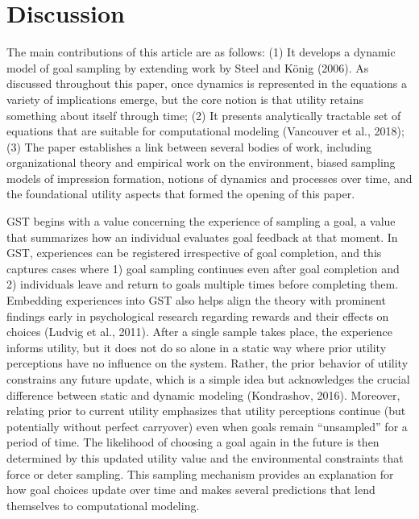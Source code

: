\documentclass[english,,man]{apa6}
\theoremstyle{definition}
\theoremstyle{definition}
\theoremstyle{definition}
\theoremstyle{remark}
\begin{document}
\hypertarget{discussion}{%
\section{Discussion}\label{discussion}}

The main contributions of this article are as follows: (1) It develops a
dynamic model of goal sampling by extending work by Steel and König
(2006). As discussed throughout this paper, once dynamics is represented
in the equations a variety of implications emerge, but the core notion
is that utility retains something about itself through time; (2) It
presents analytically tractable set of equations that are suitable for
computational modeling (Vancouver et al., 2018); (3) The paper
establishes a link between several bodies of work, including
organizational theory and empirical work on the environment, biased
sampling models of impression formation, notions of dynamics and
processes over time, and the foundational utility aspects that formed
the opening of this paper.

GST begins with a value concerning the experience of sampling a goal, a
value that summarizes how an individual evaluates goal feedback at that
moment. In GST, experiences can be registered irrespective of goal
completion, and this captures cases where 1) goal sampling continues
even after goal completion and 2) individuals leave and return to goals
multiple times before completing them. Embedding experiences into GST
also helps align the theory with prominent findings early in
psychological research regarding rewards and their effects on choices
(Ludvig et al., 2011). After a single sample takes place, the experience
informs utility, but it does not do so alone in a static way where prior
utility perceptions have no influence on the system. Rather, the prior
behavior of utility constrains any future update, which is a simple idea
but acknowledges the crucial difference between static and dynamic
modeling (Kondrashov, 2016). Moreover, relating prior to current utility
emphasizes that utility perceptions continue (but potentially without
perfect carryover) even when goals remain \enquote{unsampled} for a
period of time. The likelihood of choosing a goal again in the future is
then determined by this updated utility value and the environmental
constraints that force or deter sampling. This sampling mechanism
provides an explanation for how goal choices update over time and makes
several predictions that lend themselves to computational modeling.
\end{document}
